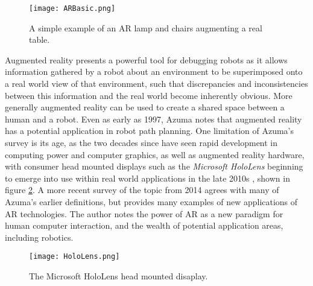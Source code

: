\begin{figure}[h]
	\begin{center}
	\texttt{[image: ARBasic.png]}
	\decoRule
	\caption[Simple AR visualisation. \cite{Azuma:1997}]{A simple example of an AR lamp and chairs augmenting a real table. \cite{Azuma:1997}}
	\label{fig:ARBasic}
	\end{center}
\end{figure}

Augmented reality presents a powerful tool for debugging robots as it allows information gathered by a robot about an environment to be superimposed onto a real world view of that environment, such that discrepancies and inconsistencies between this information and the real world become inherently obvious. More generally augmented reality can be used to create a shared space between a human and a robot. Even as early as 1997, Azuma \cite{Azuma:1997} notes that augmented reality has a potential application in robot path planning. One limitation of Azuma's survey is its age, as the two decades since have seen rapid development in computing power and computer graphics, as well as augmented reality hardware, with consumer head mounted displays such as the \textit{Microsoft HoloLens} beginning to emerge into use within real world applications in the late 2010s \cite{HoloLens}, shown in figure \ref{fig:HoloLens}. A more recent survey of the topic from 2014 \cite{Billinghurst:2014} agrees with many of Azuma's earlier definitions, but provides many examples of new applications of AR technologies. The author notes the power of AR as a new paradigm for human computer interaction, and the wealth of potential application areas, including robotics.

\begin{figure}
	\begin{center}
	\texttt{[image: HoloLens.png]}
	\decoRule
	\caption[Microsoft HoloLens. ]{The Microsoft HoloLens head mounted disaplay.}
	\label{fig:HoloLens}
	\end{center}
\end{figure}

